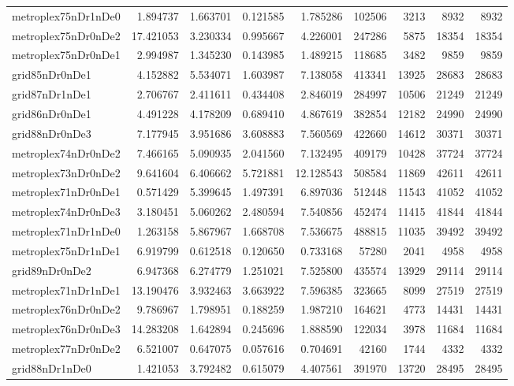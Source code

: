\begin{longtable}{|l|r|r|r|r|r|r|r|r|}
metroplex75nDr1nDe0 & 1.894737 & 1.663701 & 0.121585 & 1.785286 & 102506 & 3213 & 8932 & 8932 \\
metroplex75nDr0nDe2 & 17.421053 & 3.230334 & 0.995667 & 4.226001 & 247286 & 5875 & 18354 & 18354 \\
metroplex75nDr0nDe1 & 2.994987 & 1.345230 & 0.143985 & 1.489215 & 118685 & 3482 & 9859 & 9859 \\
grid85nDr0nDe1 & 4.152882 & 5.534071 & 1.603987 & 7.138058 & 413341 & 13925 & 28683 & 28683 \\
grid87nDr1nDe1 & 2.706767 & 2.411611 & 0.434408 & 2.846019 & 284997 & 10506 & 21249 & 21249 \\
grid86nDr0nDe1 & 4.491228 & 4.178209 & 0.689410 & 4.867619 & 382854 & 12182 & 24990 & 24990 \\
grid88nDr0nDe3 & 7.177945 & 3.951686 & 3.608883 & 7.560569 & 422660 & 14612 & 30371 & 30371 \\
metroplex74nDr0nDe2 & 7.466165 & 5.090935 & 2.041560 & 7.132495 & 409179 & 10428 & 37724 & 37724 \\
metroplex73nDr0nDe2 & 9.641604 & 6.406662 & 5.721881 & 12.128543 & 508584 & 11869 & 42611 & 42611 \\
metroplex71nDr0nDe1 & 0.571429 & 5.399645 & 1.497391 & 6.897036 & 512448 & 11543 & 41052 & 41052 \\
metroplex74nDr0nDe3 & 3.180451 & 5.060262 & 2.480594 & 7.540856 & 452474 & 11415 & 41844 & 41844 \\
metroplex71nDr1nDe0 & 1.263158 & 5.867967 & 1.668708 & 7.536675 & 488815 & 11035 & 39492 & 39492 \\
metroplex75nDr1nDe1 & 6.919799 & 0.612518 & 0.120650 & 0.733168 & 57280 & 2041 & 4958 & 4958 \\
grid89nDr0nDe2 & 6.947368 & 6.274779 & 1.251021 & 7.525800 & 435574 & 13929 & 29114 & 29114 \\
metroplex71nDr1nDe1 & 13.190476 & 3.932463 & 3.663922 & 7.596385 & 323665 & 8099 & 27519 & 27519 \\
metroplex76nDr0nDe2 & 9.786967 & 1.798951 & 0.188259 & 1.987210 & 164621 & 4773 & 14431 & 14431 \\
metroplex76nDr0nDe3 & 14.283208 & 1.642894 & 0.245696 & 1.888590 & 122034 & 3978 & 11684 & 11684 \\
metroplex77nDr0nDe2 & 6.521007 & 0.647075 & 0.057616 & 0.704691 & 42160 & 1744 & 4332 & 4332 \\
grid88nDr1nDe0 & 1.421053 & 3.792482 & 0.615079 & 4.407561 & 391970 & 13720 & 28495 & 28495 \\

\end{longtable}
